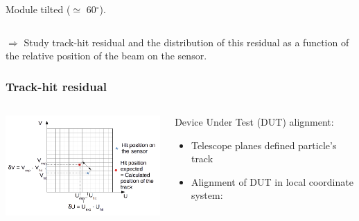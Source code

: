 \documentclass{beamer}
\newcommand{\grille}{
    \begin{tikzpicture}[overlay,remember picture]
        \begin{scope}[shift={(current page.south west)}]
            \draw[gray!50] (0,0) grid[step=2mm] (current page.north east);
            \draw[red!50] (0,0) grid[step=1cm] (current page.north east);
            \draw (0.2,1) node {1};
            \draw (0.2,2) node {2};
            \draw (0.2,3) node {3};
            \draw (0.2,4) node {4};
            \draw (0.2,5) node {5};
            \draw (0.2,6) node {6};
            \draw (0.2,7) node {7};
            \draw (0.2,8) node {8};
            \draw (0.2,9) node {9};
            \draw (1,0.5) node {1};
            \draw (2,0.5) node {2};
            \draw (3,0.5) node {3};
            \draw (4,0.5) node {4};
            \draw (5,0.5) node {5};
            \draw (6,0.5) node {6};
            \draw (7,0.5) node {7};
            \draw (8,0.5) node {8};
            \draw (9,0.5) node {9};
            \draw (10,0.5) node {10};
            \draw (11,0.5) node {11};
            \draw (12,0.5) node {12};
        \end{scope}
    \end{tikzpicture}
}
\newcommand{\degres}{\ensuremath{^\circ}}
\begin{document}
\begin{frame}
\begin{columns}[t]
\begin{column}{4cm}
\begin{center}
          \footnotesize{Module tilted ($\simeq$ 60\degres).}
        \end{center}
      \end{column}
    \end{columns}

    \vspace{0.1cm}
    \footnotesize{$\Rightarrow$ Study track-hit residual and the distribution of this residual as a function of the relative position of the beam on the sensor.

    \vspace{0.1cm}
    }
\end{frame}

\begin{frame}
    \frametitle{Track-hit residual}

    \begin{columns}[t]
      \begin{column}{7cm}
        \begin{center}
          \includegraphics[width = 7cm]{Pictures/residual_explanation.png}
        \end{center}
      \end{column}
      \begin{column}{4cm}
        \scriptsize{
        \begin{block}{Device Under Test (DUT) alignment:}
          \begin{itemize}
            \item Telescope planes defined particle's track
            \item Alignment of DUT in local coordinate system:
          \end{itemize}
        \end{block}
      }
      \end{column}
    \end{columns}
\end{frame}
\end{document}
